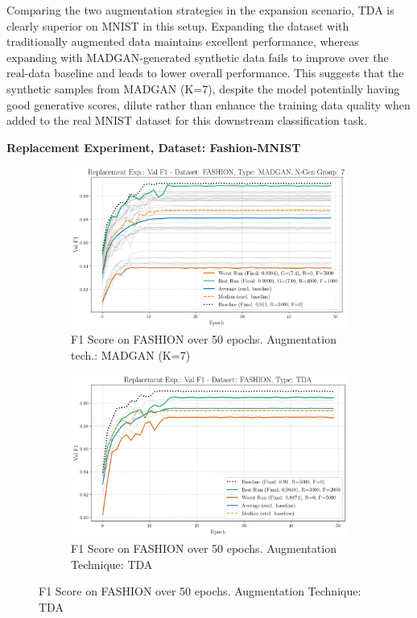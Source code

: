 Comparing the two augmentation strategies in the expansion scenario, TDA is clearly superior on MNIST in this setup. Expanding the dataset with traditionally augmented data maintains excellent performance, whereas expanding with MADGAN-generated synthetic data fails to improve over the real-data baseline and leads to lower overall performance. This suggests that the synthetic samples from MADGAN (K=7), despite the model potentially having good generative scores, dilute rather than enhance the training data quality when added to the real MNIST dataset for this downstream classification task.

\newpage
\noindent\textbf{Replacement Experiment, Dataset: Fashion-MNIST}
\begin{figure}[H]
	\centering
	\begin{subfigure}{.85\textwidth}
		\includegraphics[width=\textwidth]{abb/strat_classifier_performance/FASHION_STRATIFIED_CLASSIFIERS_MADGAN_NEW/replacement_experiments/val_f1_score_MADGAN_FASHION_n_gen_7_all.png}
		\caption{F1 Score on FASHION over 50 epochs. Augmentation tech.: MADGAN (K=7)}
        \label{fig:res_replacement_fashion_tda_vs_madgan__madgan}
	\end{subfigure}
	\begin{subfigure}{.85\textwidth}
		\includegraphics[width=\textwidth]{abb/strat_classifier_performance/tda_fashion_mnist/replacement_experiments/val_f1_score_tda_fashion_mnist_fashion_all.png}
		\caption{F1 Score on FASHION over 50 epochs. Augmentation Technique: TDA}
        \label{fig:res_replacement_fashion_tda_vs_madgan__tda}
	\end{subfigure}
\end{figure}

